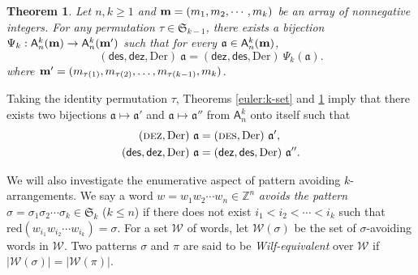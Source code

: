 \documentclass[12pt]{amsart}
\numberwithin{equation}{section}
\theoremstyle{plain}
\newtheorem{theorem}{Theorem}[section]
\theoremstyle{definition}
\newcommand{\Z}{\mathbb{Z}}
\newcommand\A{\mathsf{A}}
\def\dez{\mathsf{dez}}
\def\reduction{\mathrm{red}}
\def\Der{\mathrm{Der}}
\def\DES{\hbox{\rm\textsc{des}}}
\def\DEZ{\hbox{\rm\textsc{dez}}}
\def\des{\mathsf{des}}
\def\S{\mathfrak{S}}
\def\a{\mathfrak{a}}
\begin{document}
\begin{theorem}\label{double-euler}
Let $n,k\geq1$ and 
${\bf m}=(m_1, m_2, \cdots, m_k)$ be an array of nonnegative integers.
	For any permutation $\tau\in \S_{k-1}$,
	there exists a bijection $\Psi_k: \A_n^k({\bf m}) \rightarrow \A_n^k({\bf m'})$ such that for every $\a\in\A_n^k(\bf m)$,
\begin{equation}\label{eq:double-euler}
(\des, \dez, \Der)~\a = (\dez, \des, \Der)~\Psi_k(\a).
\end{equation}
	where ${\bf m'} = (m_{\tau(1)}, m_{\tau(2)}, \ldots, m_{\tau(k-1)}, m_k)$.
\end{theorem}

Taking the identity permutation $\tau$, Theorems \ref{euler:k-set} and \ref{double-euler} imply that there exists two bijections $\a \mapsto \a'$ and $\a\mapsto \a''$  from $\A_n^k$ onto itself such that
\begin{align*}
	(\DEZ,  \Der)~\a &= (\DES,  \Der)~\a',\\
	(\des, \dez, \Der)~\a &= (\dez, \des, \Der)~\a''.
\end{align*}

\medskip

We will also investigate the enumerative aspect of pattern avoiding $k$-arrangements.
We say a word $w=w_1w_2\cdots w_n\in\Z^n$ {\em avoids the pattern} $\sigma=\sigma_1\sigma_2\cdots \sigma_k\in\S_k$ ($k\leq n$) if there does not exist $i_1<i_2<\cdots<i_k$ such that  $\reduction(w_{i_1}w_{i_2}\cdots w_{i_k})=\sigma$. For a set $\mathcal{W}$ of words, let $\mathcal{W}(\sigma)$ be the set of $\sigma$-avoiding words in $\mathcal{W}$. Two patterns $\sigma$ and $\pi$ are said to be {\em Wilf-equivalent} over $\mathcal{W}$ if $|\mathcal{W}(\sigma)|=|\mathcal{W}(\pi)|$. 
\end{document}
